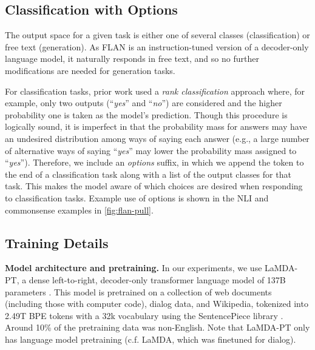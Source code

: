 \subsection{Classification with Options}\label{subsec:options}

The output space for a given task is either one of several classes (classification) or free text (generation). As FLAN is an instruction-tuned version of a decoder-only language model, it naturally responds in free text, and so no further modifications are needed for generation tasks.

For classification tasks, prior work \citep{brown2020language} used a \textit{rank classification} approach where, for example, only two outputs (``\textit{yes}'' and ``\textit{no}'') are considered and the higher probability one is taken as the model's prediction. Though this procedure is logically sound, it is imperfect in that the probability mass for answers may have an undesired distribution among ways of saying each answer (e.g., a large number of alternative ways of saying ``\textit{yes}'' may lower the probability mass assigned to ``\textit{yes}'').
Therefore, we include an \textit{options} suffix, in which we append the token \texttt{{\smallOPTIONS}} to the end of a classification task along with a list of the output classes for that task. This makes the model aware of which choices are desired when responding to classification tasks. Example use of options is shown in the NLI and commonsense examples in \ref{fig:flan-pull}.

\subsection{Training Details}

\textbf{Model architecture and pretraining.} In our experiments, we use LaMDA-PT, a dense left-to-right, decoder-only transformer language model of 137B parameters \citep{thoppilan2022lamda}. This model is pretrained on a collection of web documents (including those with computer code), dialog data, and Wikipedia, tokenized into 2.49T BPE tokens with a 32k vocabulary using the SentencePiece library \citep{sentencepiece}. Around 10\% of the pretraining data was non-English. Note that LaMDA-PT only has language model pretraining (c.f. LaMDA, which was finetuned for dialog).

